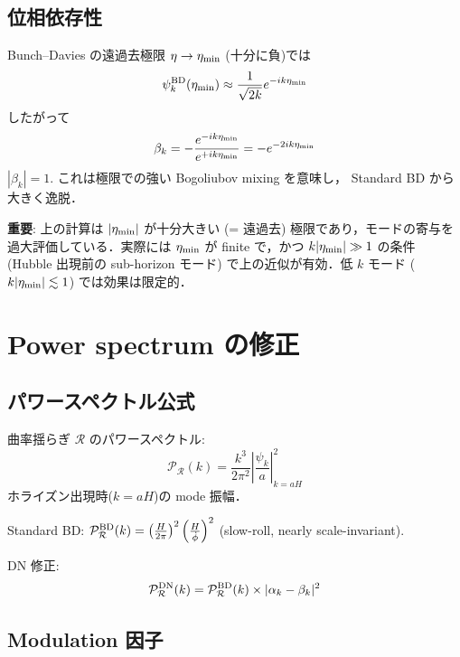 \documentclass[11pt,a4paper]{article}
\begin{document}
\subsection{位相依存性}

Bunch--Davies の遠過去極限 $\eta \to \eta_{\rm min}$ (十分に負)では
\begin{equation}
\psi_k^{\rm BD}(\eta_{\rm min}) \approx \frac{1}{\sqrt{2k}}
e^{-ik\eta_{\rm min}}
\end{equation}
したがって
\begin{equation}
\beta_k = -\frac{e^{-ik\eta_{\rm min}}}{e^{+ik\eta_{\rm min}}}
= -e^{-2ik\eta_{\rm min}}
\end{equation}
$|\beta_k| = 1$. これは極限での強い Bogoliubov mixing を意味し，
Standard BD から大きく逸脱．

\textbf{重要}: 上の計算は $|\eta_{\rm min}|$ が十分大きい (= 遠過去)
極限であり，モードの寄与を過大評価している．実際には $\eta_{\rm min}$ が
finite で，かつ $k|\eta_{\rm min}| \gg 1$ の条件 (Hubble 出現前の
sub-horizon モード) で上の近似が有効．低 $k$ モード
($k|\eta_{\rm min}| \lesssim 1$) では効果は限定的．

\section{Power spectrum の修正}

\subsection{パワースペクトル公式}

曲率揺らぎ $\mathcal{R}$ のパワースペクトル:
\begin{equation}
\mathcal{P}_{\mathcal{R}}(k) = \frac{k^3}{2\pi^2}\left|\frac{\psi_k}{a}\right|^2_{k=aH}
\end{equation}
ホライズン出現時($k = aH$)の mode 振幅．

Standard BD: $\mathcal{P}_{\mathcal{R}}^{\rm BD}(k) = \left(\frac{H}{2\pi}\right)^2
\left(\frac{H}{\dot\phi}\right)^2$ (slow-roll, nearly scale-invariant).

DN 修正:
\begin{equation}
\mathcal{P}_{\mathcal{R}}^{\rm DN}(k) = \mathcal{P}_{\mathcal{R}}^{\rm BD}(k)
\times |\alpha_k - \beta_k|^2
\end{equation}

\subsection{Modulation 因子}
\end{document}
